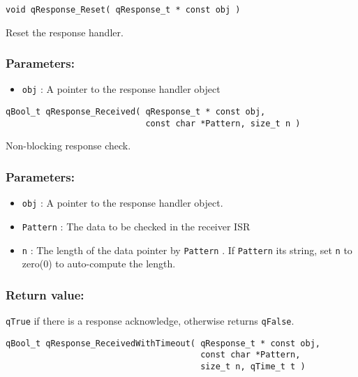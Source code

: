 \noindent\hrulefill

\begin{lstlisting}[style=CStyle]
void qResponse_Reset( qResponse_t * const obj )
\end{lstlisting}

Reset the response handler. 

\subsubsection*{Parameters:}
\begin{itemize}
    \item \lstinline{obj} : A pointer to the response handler object
\end{itemize}

\noindent\hrulefill

\begin{lstlisting}[style=CStyle]
qBool_t qResponse_Received( qResponse_t * const obj, 
                            const char *Pattern, size_t n )
\end{lstlisting}

Non-blocking response check. 

\subsubsection*{Parameters:}
\begin{itemize}
    \item \lstinline{obj} : A pointer to the response handler object.
    \item \lstinline{Pattern} : The data to be checked in the receiver ISR
    \item \lstinline{n} : The length of the data pointer by \lstinline{Pattern} . If \lstinline{Pattern} its string, set \lstinline{n} to zero(0) to auto-compute the length.
\end{itemize}

\subsubsection*{Return value:}
\lstinline{qTrue} if there is a response acknowledge, otherwise returns \lstinline{qFalse}.

\noindent\hrulefill

\begin{lstlisting}[style=CStyle]
qBool_t qResponse_ReceivedWithTimeout( qResponse_t * const obj, 
                                       const char *Pattern, 
                                       size_t n, qTime_t t )
\end{lstlisting}

